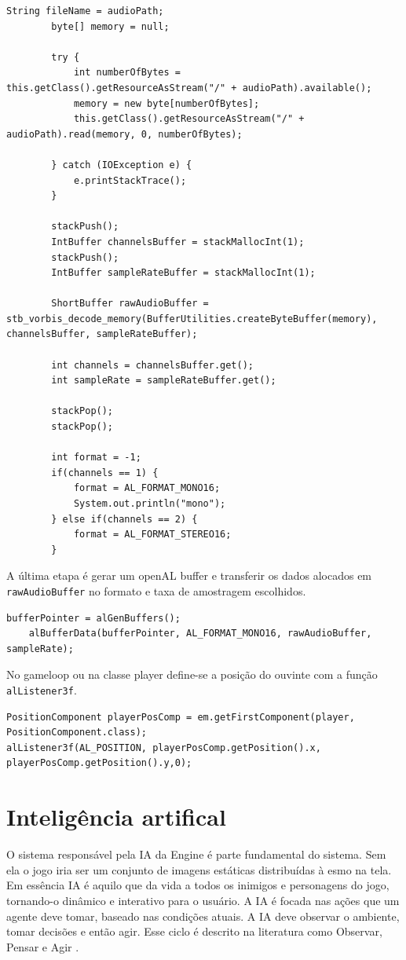 \documentclass[12pt, 
openright, 
oneside, 
a4paper,    
brazil]{facom-ufu-abntex2}
\begin{document}
\begin{lstlisting}[caption=Leitura do arquivo de aúdio]
        String fileName = audioPath;
        byte[] memory = null;
         
        try {
            int numberOfBytes = this.getClass().getResourceAsStream("/" + audioPath).available();
            memory = new byte[numberOfBytes];
            this.getClass().getResourceAsStream("/" + audioPath).read(memory, 0, numberOfBytes);
             
        } catch (IOException e) {
            e.printStackTrace();
        }
 
        stackPush();
        IntBuffer channelsBuffer = stackMallocInt(1);
        stackPush();
        IntBuffer sampleRateBuffer = stackMallocInt(1);

        ShortBuffer rawAudioBuffer = stb_vorbis_decode_memory(BufferUtilities.createByteBuffer(memory), channelsBuffer, sampleRateBuffer);
 
        int channels = channelsBuffer.get();
        int sampleRate = sampleRateBuffer.get();

        stackPop();
        stackPop();
 
        int format = -1;
        if(channels == 1) {
            format = AL_FORMAT_MONO16;
            System.out.println("mono");
        } else if(channels == 2) {
            format = AL_FORMAT_STEREO16;
        }
\end{lstlisting}

A última etapa é gerar um openAL buffer e transferir os dados alocados em \texttt{rawAudioBuffer} no formato e taxa de amostragem escolhidos.
\begin{lstlisting}[caption=OpenAL Buffers]
    bufferPointer = alGenBuffers();
    alBufferData(bufferPointer, AL_FORMAT_MONO16, rawAudioBuffer, sampleRate);
\end{lstlisting}

No gameloop ou na classe player define-se a posição do ouvinte com a função \texttt{alListener3f}.

\begin{lstlisting}[caption=OpenAL Listener]
PositionComponent playerPosComp = em.getFirstComponent(player, PositionComponent.class);
alListener3f(AL_POSITION, playerPosComp.getPosition().x, playerPosComp.getPosition().y,0);
\end{lstlisting}

\chapter{Inteligência artifical}
O sistema responsável pela IA da Engine é parte fundamental do sistema. Sem ela o jogo iria ser um conjunto de imagens estáticas distribuídas à esmo na tela.
Em essência IA é aquilo que da vida a todos os inimigos e personagens do jogo, tornando-o dinâmico e interativo para o usuário.
A IA é focada nas ações que um agente deve tomar, baseado nas condições atuais. A IA deve observar o ambiente, tomar decisões e então agir. Esse ciclo é descrito na literatura como Observar, Pensar e Agir \cite{GameDevAI}.
\end{document}
